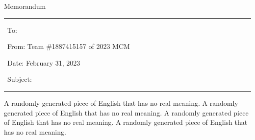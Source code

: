 \documentclass[12pt]{ctexart}
\begin{document}












\newpage
\thispagestyle{empty}
\vspace{-6cm}

\begin{letter}{ \centering Memorandum }
	
	\noindent\rule{\textwidth}{1pt}

	\vspace{-0.2cm}

	\noindent \ To: 

	\vspace{-0.2cm}

	\noindent \ From: Team \#1887415157 of 2023 MCM

	\vspace{-0.2cm}

	\noindent \ Date: February 31, 2023

	\vspace{-0.2cm}

	\noindent \ Subject:

	\vspace{-0.4cm}

	\noindent\rule{\textwidth}{1pt}

	A randomly generated piece of English that has no real meaning. A randomly generated piece of English that has no real meaning. A randomly generated piece of English that has no real meaning. A randomly generated piece of English that has no real meaning. 

	\begin{figure}%
	\centering
	\begin{tcolorbox}
		[
		colback=yellow!9!white,%
		colframe=white!75!white,%
		width=7cm,%
		arc=5mm, auto outer arc,
		boxrule=0.5pt,
		]
		
		\vspace{0.2cm}
		

\end{tcolorbox}
\end{figure}
\end{letter}
\end{document}
